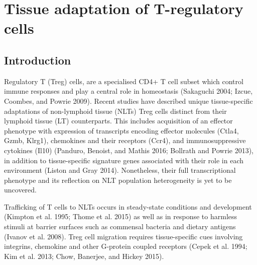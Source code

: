 
\chapter{Tissue adaptation of T-regulatory cells}

\ifpdf
    \graphicspath{{Chapter2/Figs/Raster/}{Chapter2/Figs/PDF/}{Chapter2/Figs/}}
\else
    \graphicspath{{Chapter2/Figs/Vector/}{Chapter2/Figs/}}
\fi


\section[Introduction]{Introduction}
\label{section2.1}

Regulatory T (Treg) cells, are a specialised CD4+ T cell subset which control immune responses and play a central role in homeostasis (Sakaguchi 2004; Izcue, Coombes, and Powrie 2009). Recent studies have described unique tissue-specific adaptations of non-lymphoid tissue (NLTs) Treg cells distinct from their lymphoid tissue (LT) counterparts. This includes acquisition of an effector phenotype with expression of transcripts encoding effector molecules (Ctla4, Gzmb, Klrg1), chemokines and their receptors (Ccr4), and immunosuppressive cytokines (Il10) (Panduro, Benoist, and Mathis 2016; Bollrath and Powrie 2013), in addition to tissue-specific signature genes associated with their role in each environment (Liston and Gray 2014). Nonetheless, their full transcriptional phenotype and its reflection on NLT population heterogeneity is yet to be uncovered.

Trafficking of T cells to NLTs occurs in steady-state conditions and development (Kimpton et al. 1995; Thome et al. 2015) as well as in response to harmless stimuli at barrier surfaces such as commensal bacteria and dietary antigens (Ivanov et al. 2008). Treg cell migration requires tissue-specific cues involving integrins, chemokine and other G-protein coupled receptors (Cepek et al. 1994; Kim et al. 2013; Chow, Banerjee, and Hickey 2015).

